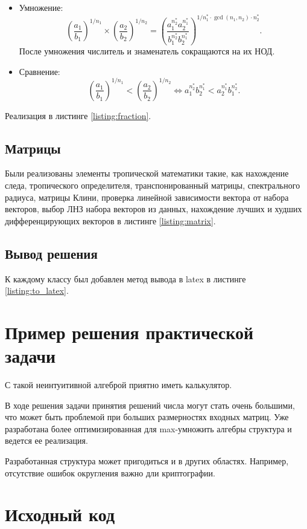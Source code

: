 \documentclass[specialist, substylefile = spbureport.rtx,
    subf,href,colorlinks=true, 12pt]{disser}
\begin{document}
    \begin{itemize}
        \item Умножение:
        $$ \left(\frac{a_1}{b_1}\right)^{1/n_1} \times \left(\frac{a_2}{b_2}\right)^{1/n_2} = \left(\frac{a_1^{n^*_2}a_2^{n^*_1}}{b_1^{n^*_2}b_2^{n^*_1}}\right)^{1/n^*_1\cdot \gcd(n_1, n_2) \cdot n^*_2}.$$
        После умножения числитель и знаменатель сокращаются на их НОД.
        \item Сравнение:
        $$ \left(\frac{a_1}{b_1}\right)^{1/n_1} < \left(\frac{a_2}{b_2}\right)^{1/n_2} \Leftrightarrow
        {a_1^{n^*_2}}{b_2^{n^*_1}} < {a_2^{n^*_1}}{b_1^{n^*_2}}.$$
    \end{itemize}

    Реализация в листинге \ref{listing:fraction}.


    \section{Матрицы}
    Были реализованы элементы тропической математики такие, как нахождение следа, тропического определителя, транспонированный матрицы, спектрального радиуса, матрицы Клини, проверка линейной зависимости вектора от набора векторов, выбор ЛНЗ набора векторов из данных, нахождение лучших и худших дифференцирующих векторов в листинге \ref{listing:matrix}.


    \section{Вывод решения}
    К каждому классу был добавлен метод вывода в latex в листинге \ref{listing:to_latex}.
    



    \chapter{Пример решения практической задачи}
        

    \conclusion

    С такой неинтуитивной алгеброй приятно иметь калькулятор.
    
    В ходе решения задачи принятия решений числа могут стать очень большими, что может быть проблемой при больших размерностях входных матриц. Уже разработана более оптимизированная для max-умножить алгебры структура и ведется ее реализация.

    Разработанная структура может пригодиться и в других областях. Например, отсутствие ошибок округления важно дли криптографии.
    
    \renewcommand{\refname}{}
    \vspace{-25pt}
    
    

    \appendix
        \chapter{Исходный код}

    
    
    
\end{document}
